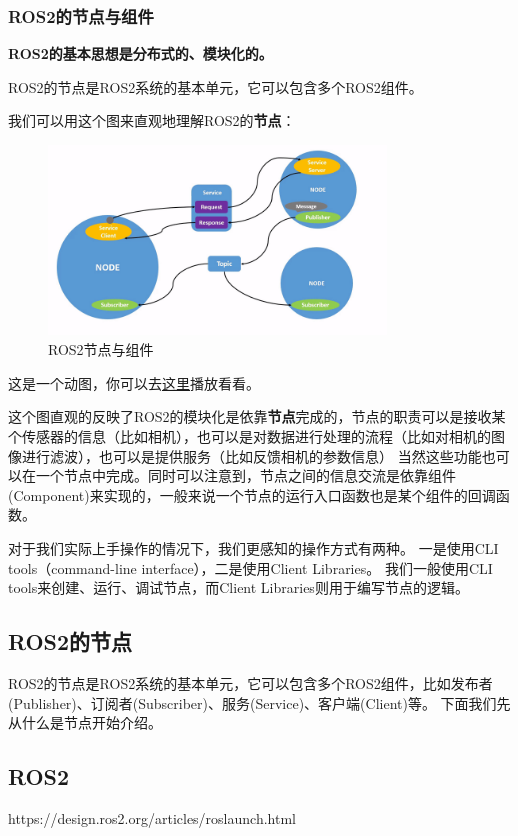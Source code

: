 \subsubsection{ROS2的节点与组件}
\textbf{ROS2的基本思想是分布式的、模块化的。}

ROS2的节点是ROS2系统的基本单元，它可以包含多个ROS2组件。

我们可以用这个图来直观地理解ROS2的\textbf{节点}：
\begin{figure}[h]
    \centering
    \includegraphics[width=0.8\textwidth]{Chapter4/img/ros2_node.png}
    \caption{ROS2节点与组件}
    \label{fig:ros2_node}
\end{figure}
这是一个动图，你可以去\underline{\href{https://docs.ros.org/en/humble/_images/Nodes-TopicandService.gif}{这里}}播放看看。

这个图直观的反映了ROS2的模块化是依靠\textbf{节点}完成的，节点的职责可以是接收某个传感器的信息（比如相机），也可以是对数据进行处理的流程（比如对相机的图像进行滤波），也可以是提供服务（比如反馈相机的参数信息）
当然这些功能也可以在一个节点中完成。同时可以注意到，节点之间的信息交流是依靠组件(Component)来实现的，一般来说一个节点的运行入口函数也是某个组件的回调函数。


对于我们实际上手操作的情况下，我们更感知的操作方式有两种。
一是使用CLI tools（command-line interface），二是使用Client Libraries。
我们一般使用CLI tools来创建、运行、调试节点，而Client Libraries则用于编写节点的逻辑。

\subsection{ROS2的节点}
ROS2的节点是ROS2系统的基本单元，它可以包含多个ROS2组件，比如发布者(Publisher)、订阅者(Subscriber)、服务(Service)、客户端(Client)等。
下面我们先从什么是节点开始介绍。

\subsection{ROS2}

https://design.ros2.org/articles/roslaunch.html